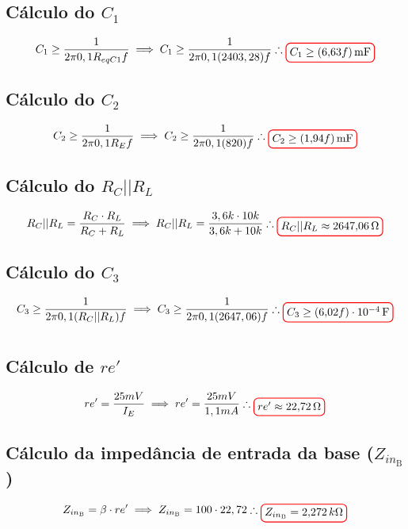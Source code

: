 \documentclass[12pt,openany,oneside,a4paper]{abntex2}
\begin{document}
\subsection{Cálculo do $C_{1}$}
\[
C_{1} \geq \frac{1}{2\pi0,1R_{eqC1}f} \implies C_{1} \geq \frac{1}{2\pi0,1(2403,28)f} \therefore \tikz[baseline]{\node[draw=red, thick, rounded corners] {$C_{1} \geq (6{,}63f)\,\text{mF}$};}
\]

\subsection{Cálculo do $C_{2}$}
\[
C_{2} \geq \frac{1}{2\pi0,1R_{E}f} \implies C_{2} \geq \frac{1}{2\pi0,1(820)f} \therefore \tikz[baseline]{\node[draw=red, thick, rounded corners] {$C_{2} \geq (1{,}94f)\,\text{mF}$};}
\]

\subsection{Cálculo do $R_{C} || R_{L}$}
\[
R_{C} || R_{L} = \frac{R_{C} \cdot R_{L}}{R_{C} + R_{L}} \implies R_{C} || R_{L} = \frac{3,6k \cdot 10k}{3,6k + 10k} \therefore \tikz[baseline]{\node[draw=red, thick, rounded corners] {$R_{C} || R_{L} \approx 2647{,}06\,\Omega$};}
\]

\subsection{Cálculo do $C_{3}$}
\[
C_{3} \geq \frac{1}{2\pi0,1(R_{C} || R_{L})f} \implies C_{3} \geq \frac{1}{2\pi0,1(2647,06)f} \therefore \tikz[baseline]{\node[draw=red, thick, rounded corners] {$C_{3} \geq (6{,}02f)\cdot 10^{-4}\,\text{F}$};}
\]

\section{}

\subsection{Cálculo de $re'$}
\[
re' = \frac{25mV}{I_{E}} \implies re' = \frac{25mV}{1,1mA} \therefore \tikz[baseline]{\node[draw=red, thick, rounded corners] {$re' \approx 22{,}72\,\Omega$};}
\]

\subsection{Cálculo da impedância de entrada da base ($Z_{in_{\text{B}}}$)}
\[
Z_{in_{\text{B}}} = \beta \cdot re' \implies Z_{in_{\text{B}}} = 100 \cdot 22,72 \therefore \tikz[baseline]{\node[draw=red, thick, rounded corners] {$Z_{in_{\text{B}}} = 2{,}272\,k\Omega$};}
\]
\end{document}
